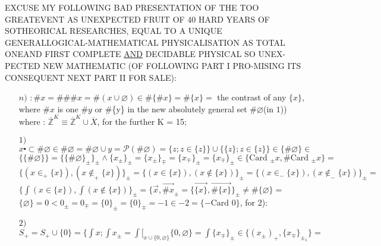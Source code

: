 \documentclass{article}
\begin{document}
\large
\noindent
EXCUSE MY FOLLOWING \guillemotleft BAD\guillemotright {} PRESENTATION OF THE TOO GREAT\linebreak EVENT AS UNEXPECTED FRUIT OF 40 HARD YEARS OF SO\linebreak THEORICAL RESEARCHES, EQUAL TO A UNIQUE GENERAL\linebreak LOGICAL-MATHEMATICAL PHYSICALISATION AS TOTAL ONE\linebreak AND FIRST COMPLETE \underline{AND} DECIDABLE PHYSICAL SO UNEX-\linebreak PECTED NEW MATHEMATIC (OF FOLLOWING PART I PRO-\linebreak MISING ITS CONSEQUENT NEXT PART II FOR SALE):
\begin{Large}{

\begin{itemize}
    \item[$n)$] $:\#x=\#\#\# x = \#(x\cup  \varnothing ) \in \# \{ \# x \} = \# \{x\}=$ the contrast of any\newline
    $\{x\}$, where $\# x$ is one \guillemotleft $\# y$ or \#\{y\}\guillemotright{} in the new absolutely general \newline
    set $\# \varnothing$(in $1$)) where : $\overline{\mathbb{Z}}^K \equiv \overline{\mathbb{Z}}^K \cup \overline{X}$, for the further K = 15;
    \item[$1)$]  $x \centerdot \subset \# \varnothing\in \#\varnothing = \#\varnothing\cup y= \mathcal{P}(\#\varnothing)=\{z;z\in \{z\}\}\cup \{\{z\};z\in \{z\}\} \in \{\#\varnothing\}\in $\newline
    $\{\{\#\varnothing\}\} = \{\{\#\varnothing\}_\pm\}_\pm \wedge \{x_\pm\}_\pm = \{x_\pm\}_\mp =\{x_\mp\}_\pm =\{x_\mp\}_\pm \in \{\text{Card }_\pm x, \# \text{Card }_\pm x \} = $\newline
    $\{(x\in_+ \{x\}),(x\notin_+ \{x\})\}_\pm = \{(x\in \{x\}),(x\notin\{x\})\}_\pm= \{(x\in_- \{x\}),(x\notin_- \{x\})\}_\pm =$  \newline
    $\{ \int (x\in \{x\}), \int (x\notin \{x\})\}_\pm = \{ \overrightarrow{x}, \overrightarrow{\# x}_\pm = \{  \overrightarrow{\{x\}},  \overrightarrow{\# \{x\}}\}_\pm \neq \# \{\varnothing\}=  $\newline
    $\{\varnothing\}= 0 < 0_\pm = 0_\mp = \{0\}_\pm = \{0\}_\mp = -1 \in -2 = \{-\text{Card } 0\}$, for 2):
    \item[$2)$] $S_+ = S_+ \cup \{ 0 \} = \{\int x ; \int x_\pm = \int \bigl[_{x\cup \{0,\varnothing\}} \{0,\varnothing\} = \int \{x_\mp\}_\pm \in \{(x_\pm)_+ , \{x_\mp\}_{\pm_1}\}=$ \newline

\end{itemize}}
\end{Large}
\end{document}
